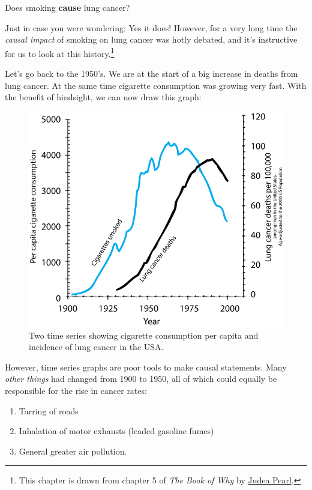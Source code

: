 \documentclass[]{book}
\providecommand{\tightlist}{%
  \setlength{\itemsep}{0pt}\setlength{\parskip}{0pt}}
\newenvironment{warning}{\begin{tcolorbox}[colback=orange!5!white,colframe=orange]}{\end{tcolorbox}}
\begin{document}
\begin{warning}
Does smoking \textbf{cause} lung cancer?
\end{warning}

Just in case you were wondering: Yes it does! However, for a very long
time the \emph{causal impact} of smoking on lung cancer was hotly
debated, and it's instructive for us to look at this history.\footnote{This
  chapter is drawn from chapter 5 of \emph{The Book of Why} by
  \href{http://bayes.cs.ucla.edu/jp_home.html}{Judea Pearl}.}

Let's go back to the 1950's. We are at the start of a big increase in
deaths from lung cancer. At the same time cigarette consumption was
growing very fast. With the benefit of hindsight, we can now draw this
graph:

\begin{figure}

{\centering \includegraphics[width=9.86in]{images/Smoking_lung_cancer} 

}

\caption{Two time series showing cigarette consumption per capita and incidence of lung cancer in the USA.}\label{fig:smoking-cancer}
\end{figure}

However, time series graphs are poor tools to make causal statements.
Many \emph{other things} had changed from 1900 to 1950, all of which
could equally be responsible for the rise in cancer rates:

\begin{enumerate}
\def\labelenumi{\arabic{enumi}.}
\tightlist
\item
  Tarring of roads
\item
  Inhalation of motor exhausts (leaded gasoline fumes)
\item
  General greater air pollution.
\end{enumerate}
\end{document}
